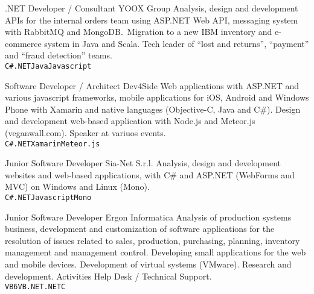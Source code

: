 \documentclass[9pt]{developercv}
\begin{document}
\begin{entrylist}
		{.NET Developer / Consultant}
		{YOOX Group}
		{Analysis, design and development APIs for the internal orders team using ASP.NET Web API, messaging system with RabbitMQ and MongoDB.\ Migration to a new IBM inventory and e-commerce system in Java and Scala. Tech leader of “lost and returns”, “payment” and “fraud detection” teams. \\
	   \texttt{C\#}\slashsep\texttt{.NET}\slashsep\texttt{Java}\slashsep\texttt{Javascript}}

		{Software Developer / Architect}
		{Dev4Side}
		{Web applications with ASP.NET and various javascript frameworks, mobile applications for iOS, Android and Windows Phone with Xamarin and native languages (Objective-C, Java and C\#). Design and development web-based application with Node.js and Meteor.js (veganwall.com). Speaker at variuos events. \\
	   \texttt{C\#}\slashsep\texttt{.NET}\slashsep\texttt{Xamarin}\slashsep\texttt{Meteor.js}}

		{Junior Software Developer}
		{Sia-Net S.r.l.}
		{Analysis, design and development websites and web-based applications, with C\# and ASP.NET (WebForms and MVC) on Windows and Linux (Mono). \\
	   \texttt{C\#}\slashsep\texttt{.NET}\slashsep\texttt{Javascript}\slashsep\texttt{Mono}}

		{Junior Software Developer}
		{Ergon Informatica}
		{Analysis of production systems business, development and customization of software applications for the resolution of issues related to sales, production, purchasing, planning, inventory management and management control. Developing small applications for the web and mobile devices. Development of virtual systems (VMware). Research and development. Activities Help Desk / Technical Support. \\
	   \texttt{VB6}\slashsep\texttt{VB.NET}\slashsep\texttt{.NET}\slashsep\texttt{C}}


\end{entrylist}
\end{document}
